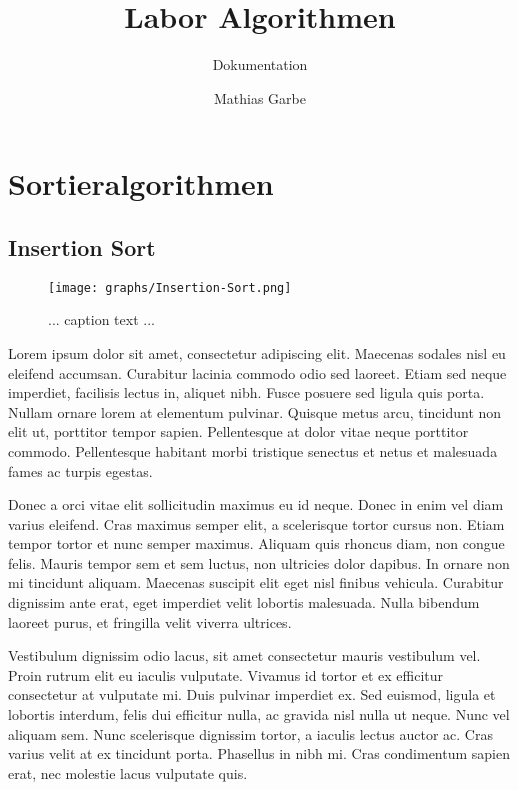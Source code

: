 \documentclass[12pt, a4paper, titlepage, hidelinks]{scrreprt}
\title{Labor Algorithmen}
\subtitle{Dokumentation}
\author{Mathias Garbe}
\begin{document}
\maketitle

\tableofcontents
{}

\clearpage


\chapter{Sortieralgorithmen}

\section{Insertion Sort}
\begin{SCfigure}
  \centering
  \caption{ ... caption text ... }
  \texttt{[image: graphs/Insertion-Sort.png]}
\end{SCfigure}
Lorem ipsum dolor sit amet, consectetur adipiscing elit. Maecenas sodales nisl eu eleifend accumsan. Curabitur lacinia commodo odio sed laoreet. Etiam sed neque imperdiet, facilisis lectus in, aliquet nibh. Fusce posuere sed ligula quis porta. Nullam ornare lorem at elementum pulvinar. Quisque metus arcu, tincidunt non elit ut, porttitor tempor sapien. Pellentesque at dolor vitae neque porttitor commodo. Pellentesque habitant morbi tristique senectus et netus et malesuada fames ac turpis egestas.

Donec a orci vitae elit sollicitudin maximus eu id neque. Donec in enim vel diam varius eleifend. Cras maximus semper elit, a scelerisque tortor cursus non. Etiam tempor tortor et nunc semper maximus. Aliquam quis rhoncus diam, non congue felis. Mauris tempor sem et sem luctus, non ultricies dolor dapibus. In ornare non mi tincidunt aliquam. Maecenas suscipit elit eget nisl finibus vehicula. Curabitur dignissim ante erat, eget imperdiet velit lobortis malesuada. Nulla bibendum laoreet purus, et fringilla velit viverra ultrices.

Vestibulum dignissim odio lacus, sit amet consectetur mauris vestibulum vel. Proin rutrum elit eu iaculis vulputate. Vivamus id tortor et ex efficitur consectetur at vulputate mi. Duis pulvinar imperdiet ex. Sed euismod, ligula et lobortis interdum, felis dui efficitur nulla, ac gravida nisl nulla ut neque. Nunc vel aliquam sem. Nunc scelerisque dignissim tortor, a iaculis lectus auctor ac. Cras varius velit at ex tincidunt porta. Phasellus in nibh mi. Cras condimentum sapien erat, nec molestie lacus vulputate quis. 
\end{document}
